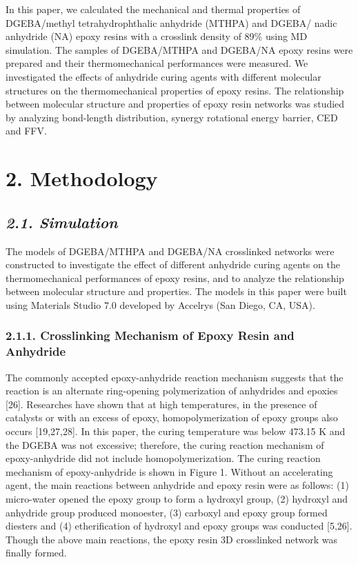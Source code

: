 \documentclass{article}
\begin{document}
In this paper, we calculated the mechanical and thermal properties of DGEBA/methyl tetrahydrophthalic anhydride (MTHPA) and DGEBA/ nadic anhydride (NA) epoxy resins with a crosslink density of 89\% using MD simulation. The samples of DGEBA/MTHPA and DGEBA/NA epoxy resins were prepared and their thermomechanical performances were measured. We investigated the effects of anhydride curing agents with different molecular structures on the thermomechanical properties of epoxy resins. The relationship between molecular structure and properties of epoxy resin networks was studied by analyzing bond-length distribution, synergy rotational energy barrier, CED and FFV.

\section*{2. Methodology}

\subsection*{\emph{2.1. Simulation}}

The models of DGEBA/MTHPA and DGEBA/NA crosslinked networks were constructed to investigate the effect of different anhydride curing agents on the thermomechanical performances of epoxy resins, and to analyze the relationship between molecular structure and properties. The models in this paper were built using Materials Studio 7.0 developed by Accelrys (San Diego, CA, USA).

\subsubsection*{2.1.1. Crosslinking Mechanism of Epoxy Resin and Anhydride}

The commonly accepted epoxy-anhydride reaction mechanism suggests that the reaction is an alternate ring-opening polymerization of anhydrides and epoxies [26]. Researches have shown that at high temperatures, in the presence of catalysts or with an excess of epoxy, homopolymerization of epoxy groups also occurs [19,27,28]. In this paper, the curing temperature was below 473.15 K and the DGEBA was not excessive; therefore, the curing reaction mechanism of epoxy-anhydride did not include homopolymerization. The curing reaction mechanism of epoxy-anhydride is shown in Figure 1. Without an accelerating agent, the main reactions between anhydride and epoxy resin were as follows: (1) micro-water opened the epoxy group to form a hydroxyl group, (2) hydroxyl and anhydride group produced monoester, (3) carboxyl and epoxy group formed diesters and (4) etherification of hydroxyl and epoxy groups was conducted [5,26]. Though the above main reactions, the epoxy resin 3D crosslinked network was finally formed.
\end{document}
